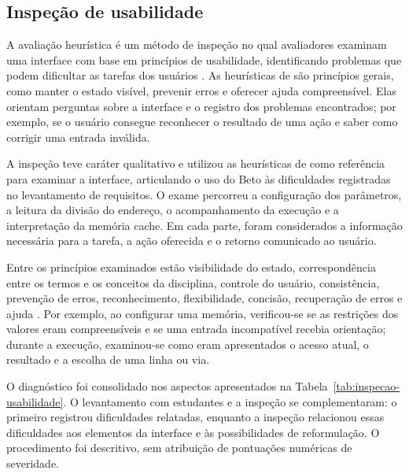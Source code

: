 \subsection{Inspeção de usabilidade}
\label{sec:inspecao-usabilidade}

A avaliação heurística é um método de inspeção no qual avaliadores examinam uma interface com base em princípios de usabilidade, identificando problemas que podem dificultar as tarefas dos usuários \cite{barbosa2010ihc}. As heurísticas de  são princípios gerais, como manter o estado visível, prevenir erros e oferecer ajuda compreensível. Elas orientam perguntas sobre a interface e o registro dos problemas encontrados; por exemplo, se o usuário consegue reconhecer o resultado de uma ação e saber como corrigir uma entrada inválida.

A inspeção teve caráter qualitativo e utilizou as heurísticas de  como referência para examinar a interface, articulando o uso do Beto às dificuldades registradas no levantamento de requisitos. O exame percorreu a configuração dos parâmetros, a leitura da divisão do endereço, o acompanhamento da execução e a interpretação da memória cache. Em cada parte, foram considerados a informação necessária para a tarefa, a ação oferecida e o retorno comunicado ao usuário.

Entre os princípios examinados estão visibilidade do estado, correspondência entre os termos e os conceitos da disciplina, controle do usuário, consistência, prevenção de erros, reconhecimento, flexibilidade, concisão, recuperação de erros e ajuda \cite{nielsen1994heuristics}. Por exemplo, ao configurar uma memória, verificou-se se as restrições dos valores eram compreensíveis e se uma entrada incompatível recebia orientação; durante a execução, examinou-se como eram apresentados o acesso atual, o resultado e a escolha de uma linha ou via.

O diagnóstico foi consolidado nos aspectos apresentados na Tabela~\ref{tab:inspecao-usabilidade}. O levantamento com estudantes e a inspeção se complementaram: o primeiro registrou dificuldades relatadas, enquanto a inspeção relacionou essas dificuldades aos elementos da interface e às possibilidades de reformulação. O procedimento foi descritivo, sem atribuição de pontuações numéricas de severidade.

